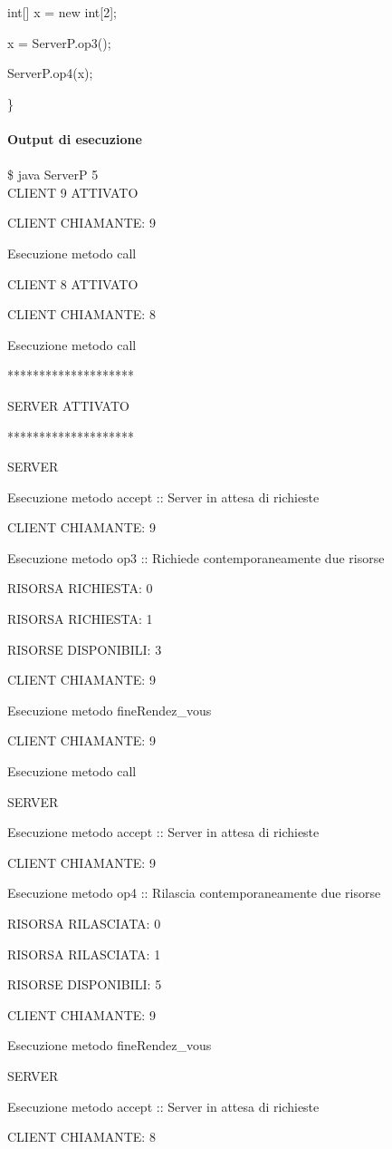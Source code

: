 \documentclass[10pt, a4paper]{article}
\begin{document}
		int[] x = new int[2];

		x = ServerP.op3();

		ServerP.op4(x);

\}
\\\\
\textbf{Output di esecuzione}
\\\\
\$ java ServerP 5
\\

CLIENT 9 ATTIVATO

CLIENT CHIAMANTE: 9

Esecuzione metodo call

CLIENT 8 ATTIVATO

CLIENT CHIAMANTE: 8

Esecuzione metodo call

********************

SERVER ATTIVATO

********************

SERVER

Esecuzione metodo accept :: Server in attesa di richieste

CLIENT CHIAMANTE: 9

Esecuzione metodo op3 :: Richiede contemporaneamente due risorse

RISORSA RICHIESTA: 0

RISORSA RICHIESTA: 1

RISORSE DISPONIBILI: 3

CLIENT CHIAMANTE: 9

Esecuzione metodo fineRendez\_vous

CLIENT CHIAMANTE: 9

Esecuzione metodo call

SERVER

Esecuzione metodo accept :: Server in attesa di richieste

CLIENT CHIAMANTE: 9

Esecuzione metodo op4 :: Rilascia contemporaneamente due risorse

RISORSA RILASCIATA: 0

RISORSA RILASCIATA: 1

RISORSE DISPONIBILI: 5

CLIENT CHIAMANTE: 9

Esecuzione metodo fineRendez\_vous

SERVER

Esecuzione metodo accept :: Server in attesa di richieste

CLIENT CHIAMANTE: 8
\end{document}
